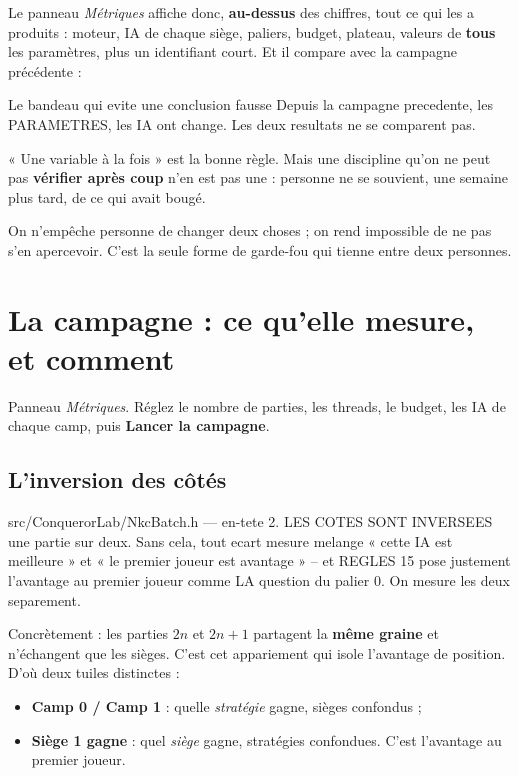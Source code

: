 Le panneau \emph{Métriques} affiche donc, \textbf{au-dessus} des chiffres, tout
ce qui les a produits : moteur, IA de chaque siège, paliers, budget, plateau,
valeurs de \textbf{tous} les paramètres, plus un identifiant court. Et il compare
avec la campagne précédente :

\begin{nkcode}{Le bandeau qui evite une conclusion fausse}
Depuis la campagne precedente, les PARAMETRES, les IA ont change.
Les deux resultats ne se comparent pas.
\end{nkcode}

\begin{nkretenir}
« Une variable à la fois » est la bonne règle. Mais une discipline qu'on ne peut
pas \textbf{vérifier après coup} n'en est pas une : personne ne se souvient, une
semaine plus tard, de ce qui avait bougé.

On n'empêche personne de changer deux choses ; on rend impossible de ne pas s'en
apercevoir. C'est la seule forme de garde-fou qui tienne entre deux personnes.
\end{nkretenir}

\section{La campagne : ce qu'elle mesure, et comment}

Panneau \emph{Métriques}. Réglez le nombre de parties, les threads, le budget, les
IA de chaque camp, puis \textbf{Lancer la campagne}.

\subsection{L'inversion des côtés}

\begin{nkcode}{src/ConquerorLab/NkcBatch.h — en-tete}
2. LES COTES SONT INVERSEES une partie sur deux. Sans cela, tout ecart
   mesure melange « cette IA est meilleure » et « le premier joueur est
   avantage » -- et REGLES 15 pose justement l'avantage au premier joueur
   comme LA question du palier 0. On mesure les deux separement.
\end{nkcode}

Concrètement : les parties $2n$ et $2n+1$ partagent la \textbf{même graine} et
n'échangent que les sièges. C'est cet appariement qui isole l'avantage de
position. D'où deux tuiles distinctes :

\begin{itemize}
  \item \textbf{Camp 0 / Camp 1} : quelle \emph{stratégie} gagne, sièges
        confondus ;
  \item \textbf{Siège 1 gagne} : quel \emph{siège} gagne, stratégies confondues.
        C'est l'avantage au premier joueur.
\end{itemize}

